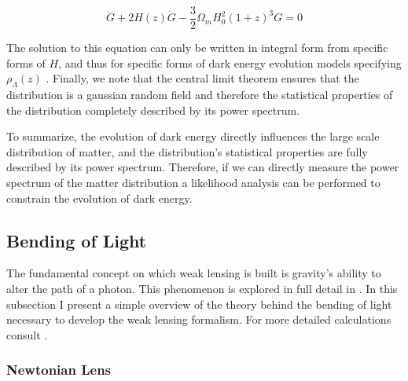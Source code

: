 \begin{equation}
  \ddot{G} + 2H(z)\dot{G} - \frac{3}{2} \Omega_m H_0^2(1+z)^3G = 0
  \label{eq:growth}
\end{equation}

The solution to this equation can only be written in integral form from specific forms of $H$, and thus for specific forms of dark energy evolution models specifying $\rho_\Lambda(z)$ \cite{general_2013,ryden}. Finally, we note that the central limit theorem ensures that the distribution is a gaussian random field and therefore the statistical properties of the distribution completely described by its power spectrum. 

\par To summarize, the evolution of dark energy directly influences the large scale distribution of matter, and the distribution's statistical properties are fully described by its power spectrum. Therefore, if we can directly measure the power spectrum of the matter distribution a likelihood analysis can be performed to constrain the evolution of dark energy.
 



\subsection{Bending of Light}
The fundamental concept on which weak lensing is built is gravity's ability to alter the path of a photon. This phenomenon is explored in full detail in \cite{GR1,basicLens,Mellier:1998pk}.
In this subsection I present a simple overview of the theory behind the bending of light necessary to develop the weak lensing formalism. For more detailed calculations consult \cite{GR1,basicLens,Mellier:1998pk}.
\subsubsection{Newtonian Lens}
\label{subsec:newtonlens}

